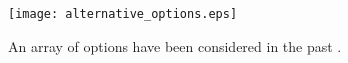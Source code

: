 \begin{figure}[htbp!]
  \begin{center}
    \texttt{[image: alternative\_options.eps]}
  \end{center}
  \caption{An array of options have been considered in the past 
    \cite{peters_whats_2013}.}
  \label{fig:alternative_options}
\end{figure}
